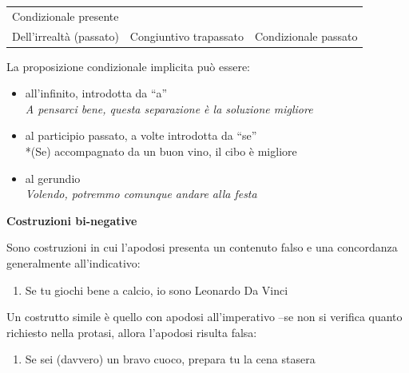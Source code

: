 \documentclass[
  a4paper,
  twoside,
  11pt,
  chapterprefix=false,
  bibliography=totocnumbered,
  listof=flat]{scrbook}
\providecommand{\tightlist}{%
  \setlength{\itemsep}{0pt}\setlength{\parskip}{0pt}}
\begin{document}
\begin{longtable}[]{@{}lll@{}}
\begin{minipage}[t]{0.38\columnwidth}
Condizionale presente\strut
\end{minipage}\tabularnewline
\begin{minipage}[t]{0.28\columnwidth}\raggedright
Dell'irrealtà (passato)\strut
\end{minipage} & \begin{minipage}[t]{0.25\columnwidth}\raggedright
Congiuntivo trapassato\strut
\end{minipage} & \begin{minipage}[t]{0.38\columnwidth}\raggedright
Condizionale passato\strut
\end{minipage}\tabularnewline
\bottomrule
\end{longtable}

La proposizione condizionale implicita può essere:

\begin{itemize}
\tightlist
\item
  all'infinito, introdotta da \enquote{a}\\
  \emph{A pensarci bene, questa separazione è la soluzione migliore}
\item
  al participio passato, a volte introdotta da \enquote{se}\\
  *(Se) accompagnato da un buon vino, il cibo è migliore
\item
  al gerundio\\
  \emph{Volendo, potremmo comunque andare alla festa}
\end{itemize}

\textbf{Costruzioni bi-negative}

Sono costruzioni in cui l'apodosi presenta un contenuto falso e una concordanza generalmente all'indicativo:

\begin{enumerate}
\def\labelenumi{(\arabic{enumi})}
\setcounter{enumi}{88}
\tightlist
\item
  Se tu giochi bene a calcio, io sono Leonardo Da Vinci
\end{enumerate}

Un costrutto simile è quello con apodosi all'imperativo --se non si verifica quanto richiesto nella protasi, allora l'apodosi risulta falsa:

\begin{enumerate}
\def\labelenumi{(\arabic{enumi})}
\setcounter{enumi}{89}
\tightlist
\item
  Se sei (davvero) un bravo cuoco, prepara tu la cena stasera
\end{enumerate}
\end{document}

